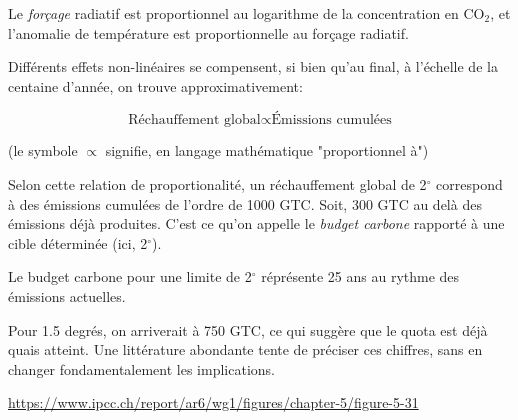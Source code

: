 Le \emph{forçage} radiatif est proportionnel au logarithme de la concentration en CO$_2$, et l'anomalie de température est proportionnelle au forçage radiatif. 

Différents effets non-linéaires se compensent, si bien qu'au final, à l'échelle de la centaine d'année, on trouve approximativement: 

\begin{equation*}
  \text{Réchauffement global} \propto \text{Émissions cumulées}
\end{equation*}

(le symbole $\propto$ signifie, en langage mathématique "proportionnel à") 

Selon cette relation de proportionalité, un réchauffement global de 2$^\circ$ correspond à des émissions cumulées de l'ordre de 1000 GTC. Soit, 300 GTC au delà des émissions déjà produites. C'est ce qu'on appelle le \emph{budget carbone} rapporté à une cible déterminée (ici, 2$^\circ$). 


Le budget carbone pour une limite de 2$^\circ$ réprésente 25 ans au rythme des émissions actuelles. 

Pour 1.5 degrés, on arriverait à 750 GTC, ce qui suggère que le quota est déjà quais atteint. Une littérature abondante tente de préciser ces chiffres, sans en changer fondamentalement les implications. 


\url{https://www.ipcc.ch/report/ar6/wg1/figures/chapter-5/figure-5-31}
